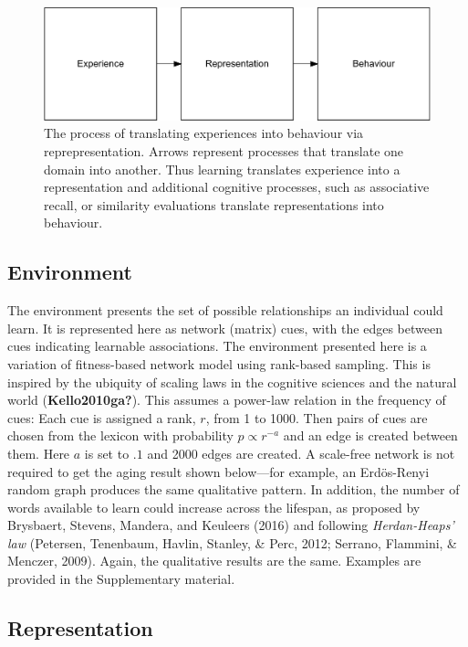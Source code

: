 \documentclass[
  man]{apa6}
\begin{document}
\begin{figure}
\centering
\includegraphics{Enrichment_files/figure-latex/Figure1-1.pdf}
\caption{\label{fig:Figure1}The process of translating experiences into behaviour via reprepresentation. Arrows represent processes that translate one domain into another. Thus learning translates experience into a representation and additional cognitive processes, such as associative recall, or similarity evaluations translate representations into behaviour.}
\end{figure}

\hypertarget{environment}{%
\subsection{Environment}\label{environment}}

The environment presents the set of possible relationships an individual could learn. It is represented here as network (matrix) cues, with the edges between cues indicating learnable associations. The environment presented here is a variation of fitness-based network model using rank-based sampling. This is inspired by the ubiquity of scaling laws in the cognitive sciences and the natural world (\textbf{Kello2010ga?}). This assumes a power-law relation in the frequency of cues: Each cue is assigned a rank, \(r\), from 1 to 1000. Then pairs of cues are chosen from the lexicon with probability \(p \propto r^{-a}\) and an edge is created between them. Here \(a\) is set to \(.1\) and 2000 edges are created. A scale-free network is not required to get the aging result shown below---for example, an Erdös-Renyi random graph produces the same qualitative pattern. In addition, the number of words available to learn could increase across the lifespan, as proposed by Brysbaert, Stevens, Mandera, and Keuleers (2016) and following \emph{Herdan-Heaps' law} (Petersen, Tenenbaum, Havlin, Stanley, \& Perc, 2012; Serrano, Flammini, \& Menczer, 2009). Again, the qualitative results are the same. Examples are provided in the Supplementary material.

\hypertarget{representation}{%
\subsection{Representation}\label{representation}}
\end{document}
